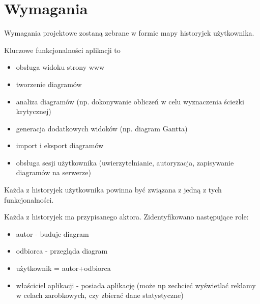 \section{Wymagania}
Wymagania projektowe zostaną zebrane w formie mapy historyjek użytkownika.

Kluczowe funkcjonalności aplikacji to
\begin{itemize}
	\item obsługa widoku strony www
	\item tworzenie diagramów
	\item analiza diagramów (np. dokonywanie obliczeń w celu wyznaczenia ścieżki krytycznej)
	\item generacja dodatkowych widoków (np. diagram Gantta)
	\item import i eksport diagramów
	\item obsługa sesji użytkownika (uwierzytelnianie, autoryzacja, zapisywanie diagramów na serwerze)
\end{itemize}
	
Każda z historyjek użytkownika powinna być związana z jedną z tych funkcjonalności. 

Każda z historyjek ma przypisanego aktora. Zidentyfikowano następujące role:
\begin{itemize}
	\item autor - buduje diagram
	\item odbiorca - przegląda diagram
	\item użytkownik = autor+odbiorca
	\item właściciel aplikacji - posiada aplikację (może np zechcieć wyświetlać reklamy w celach zarobkowych, czy zbierać dane statystyczne) 
\end{itemize}